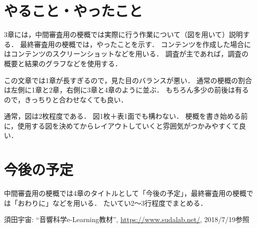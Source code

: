 \documentclass[twocolumn,10pt,a4j]{ltjsarticle}
\begin{document}
\section{やること・やったこと}

3章には，中間審査用の梗概では実際に行う作業について（図を用いて）説明する．
最終審査用の梗概では，やったことを示す．
コンテンツを作成した場合にはコンテンツのスクリーンショットなどを用いる．
調査が主であれば，調査の概要と結果のグラフなどを使用する．

この文章では1章が長すぎるので，見た目のバランスが悪い．
通常の梗概の割合は左側に1章と2章，右側に3章と4章のように並ぶ．
もちろん多少の前後は有るので，きっちりと合わせなくても良い．

通常，図は2枚程度である．
図1枚＋表1面でも構わない．
梗概を書き始める前に，使用する図を決めてからレイアウトしていくと雰囲気がつかみやすくて良い．




\section{今後の予定}
中間審査用の梗概では4章のタイトルとして「今後の予定」，最終審査用の梗概では「おわりに」などを用いる．
たいてい2〜3行程度でまとめる．

\begin{thebibliography}{99}
 須田宇宙: ``音響科学e-Learning教材'', \url{https://www.sudalab.net/}, 2018/7/19参照
\end{thebibliography}
\end{document}
